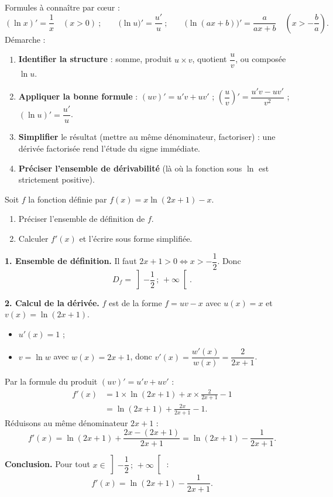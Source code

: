 \documentclass[11pt]{article}
\begin{document}
\begin{methode}
Formules à connaître par cœur :
\[ (\ln x)' = \frac{1}{x} \quad (x>0) \ ; \qquad \bigl(\ln u\bigr)' = \frac{u'}{u} \ ; \qquad \bigl(\ln(ax+b)\bigr)' = \frac{a}{ax+b} \quad \left(x > -\frac{b}{a}\right). \]
Démarche :
\begin{enumerate}
\item \textbf{Identifier la structure} : somme, produit $u \times v$, quotient $\dfrac{u}{v}$, ou composée $\ln u$.
\item \textbf{Appliquer la bonne formule} : $(uv)' = u'v + uv'$ ; $\left(\dfrac{u}{v}\right)' = \dfrac{u'v - uv'}{v^2}$ ; $(\ln u)' = \dfrac{u'}{u}$.
\item \textbf{Simplifier} le résultat (mettre au même dénominateur, factoriser) : une dérivée factorisée rend l'étude du signe immédiate.
\item \textbf{Préciser l'ensemble de dérivabilité} (là où la fonction sous $\ln$ est strictement positive).
\end{enumerate}
\end{methode}

\begin{exoresolu}
Soit $f$ la fonction définie par $f(x) = x\ln(2x+1) - x$.
\begin{enumerate}
\item Préciser l'ensemble de définition de $f$.
\item Calculer $f'(x)$ et l'écrire sous forme simplifiée.
\end{enumerate}
\tcblower
\textbf{1. Ensemble de définition.} Il faut $2x+1 > 0 \iff x > -\dfrac{1}{2}$. Donc
\[ D_f = \left]-\frac{1}{2}\,;\,+\infty\right[. \]

\textbf{2. Calcul de la dérivée.} $f$ est de la forme $f = uv - x$ avec $u(x) = x$ et $v(x) = \ln(2x+1)$.
\begin{itemize}
\item $u'(x) = 1$ ;
\item $v = \ln w$ avec $w(x) = 2x+1$, donc $v'(x) = \dfrac{w'(x)}{w(x)} = \dfrac{2}{2x+1}$.
\end{itemize}
Par la formule du produit $(uv)' = u'v + uv'$ :
\begin{align*}
f'(x) &= 1 \times \ln(2x+1) + x \times \frac{2}{2x+1} - 1 \\
&= \ln(2x+1) + \frac{2x}{2x+1} - 1.
\end{align*}
Réduisons au même dénominateur $2x+1$ :
\[ f'(x) = \ln(2x+1) + \frac{2x - (2x+1)}{2x+1} = \ln(2x+1) - \frac{1}{2x+1}. \]

\textbf{Conclusion.} Pour tout $x \in \left]-\dfrac{1}{2}\,;\,+\infty\right[$ :
\[ \boxed{f'(x) = \ln(2x+1) - \frac{1}{2x+1}}. \]
\end{exoresolu}
\end{document}

